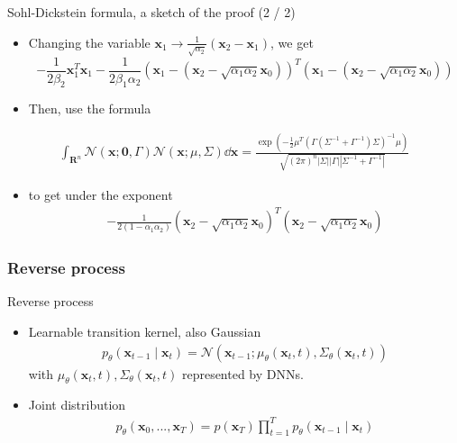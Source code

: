 \documentclass{beamer}
\begin{document}
\begin{frame}{Sohl-Dickstein formula, a sketch of the proof (2 / 2)}
  \begin{itemize}
    \item Changing the variable $\mathbf{x}_{1} \to \frac{1}{\sqrt{ \alpha_{2} }} (\mathbf{x}_{2} - \mathbf{x}_{1})$, we get 
    $$
-\frac{1}{2\beta_{2}}\mathbf{x}_{1}^T \mathbf{x}_{1} - \frac{1}{2\beta_{1}\alpha_{2}}(\mathbf{x}_{1} -(\mathbf{x}_{2} - \sqrt{ \alpha_{1}\alpha_{2} }\mathbf{x}_{0}))^T (\mathbf{x}_{1} -(\mathbf{x}_{2} - \sqrt{ \alpha_{1}\alpha_{2} }\mathbf{x}_{0}))
$$
\item Then, use the formula 
\end{itemize}
\begin{align}
  \int_{\mathbf{R}^n}{\mathcal{N}(\mathbf{x}; \mathbf{0}, \Gamma)\mathcal{N}(\mathbf{x}; \mu, \Sigma) \dd \mathbf{x}} = \frac{\exp\left(-\frac{1}{2}\mu^T (\Gamma (\Sigma^{-1} + \Gamma^{-1})\Sigma)^{-1}\mu \right)}{\sqrt{(2\pi)^n |\Sigma||\Gamma||\Sigma^{-1} + \Gamma^{-1}|}}
\end{align}
\begin{itemize}
  \item to get under the exponent 
  \begin{align*}
    -\frac{1}{2(1-\alpha_{1}\alpha_{2})}(\mathbf{x}_{2} - \sqrt{ \alpha_{1}\alpha_{2} }\mathbf{x}_{0})^T (\mathbf{x}_{2} - \sqrt{ \alpha_{1}\alpha_{2} }\mathbf{x}_{0})
  \end{align*}
\end{itemize}
\end{frame}

\subsubsection{Reverse process}
\begin{frame}{Reverse process}
\begin{itemize}
  \item Learnable transition kernel, also Gaussian 
  \begin{align}
    p_\theta (\mathbf{x}_{t-1}\mid \mathbf{x}_t) = \mathcal{N}(\mathbf{x}_{t-1}; \mu_\theta (\mathbf{x}_t, t), \Sigma_\theta (\mathbf{x}_t, t))
  \end{align}
  with $\mu_\theta (\mathbf{x}_t, t), \Sigma_\theta (\mathbf{x}_t, t)$ represented by DNNs. 
  \item Joint distribution 
  \begin{align}
    p_\theta(\mathbf{x}_0, ..., \mathbf{x}_T) = p(\mathbf{x}_T) \prod_{t=1}^{T}{p_\theta(\mathbf{x}_{t-1} \mid \mathbf{x}_t)} \label{eq:marginal-p}
  \end{align}
\end{itemize}
\end{frame}
\end{document}
